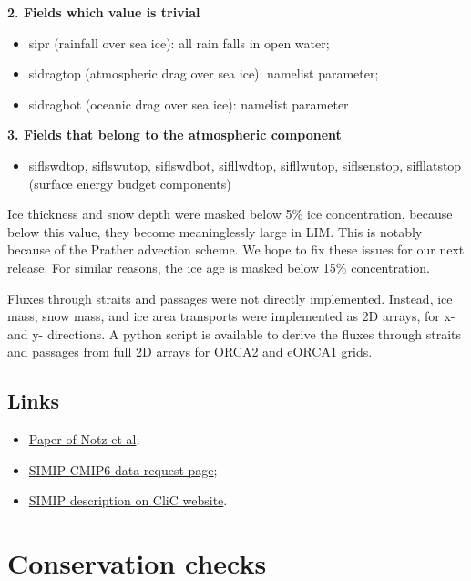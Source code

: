 \documentclass[../../tex_main/NEMO_manual]{subfiles}
\begin{document}
\textbf{2. Fields which value is trivial}
\begin{itemize}
\item sipr (rainfall over sea ice): all rain falls in open water;
\item sidragtop (atmospheric drag over sea ice): namelist parameter;
\item sidragbot (oceanic drag over sea ice): namelist parameter
\end{itemize}

\textbf{3. Fields that belong to the atmospheric component}
\begin{itemize}
\item siflswdtop, siflswutop, siflswdbot, sifllwdtop, sifllwutop, siflsenstop, sifllatstop (surface energy budget components)
\end{itemize}

Ice thickness and snow depth were masked below 5\% ice concentration, because below this value, they become meaninglessly large in LIM. This is notably because of the Prather advection scheme. We hope to fix these issues for our next release. For similar reasons, the ice age is masked below 15\% concentration.

Fluxes through straits and passages were not directly implemented. Instead, ice mass, snow mass, and ice area transports were implemented as 2D arrays, for x- and y- directions. A python script is available to derive the fluxes through straits and passages from full 2D arrays for ORCA2 and eORCA1 grids.

\subsection{Links}

\begin{itemize}
\item \textcolor{blue}{\href{http://www.geosci-model-dev.net/9/3427/2016/}{Paper of Notz et al}};
\item \textcolor{blue}{\href{http://clipc-services.ceda.ac.uk/dreq/u/SIMIP.html}{SIMIP CMIP6 data request page}};
\item \textcolor{blue}{\href{http://www.climate-cryosphere.org/activities/targeted/simip}{SIMIP description on CliC website}}.
\end{itemize}

\section{Conservation checks}
\end{document}

